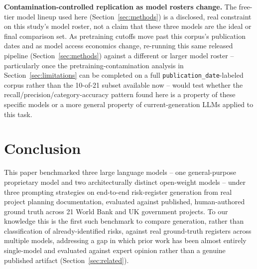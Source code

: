 \documentclass[conference]{IEEEtran}
\begin{document}
\textbf{Contamination-controlled replication as model rosters change.} The
free-tier model lineup used here (Section~\ref{sec:methods}) is a
disclosed, real constraint on this study's model roster, not a claim that
these three models are the ideal or final comparison set. As pretraining
cutoffs move past this corpus's publication dates and as model access
economics change, re-running this same released pipeline
(Section~\ref{sec:methods}) against a different or larger model roster --
particularly once the pretraining-contamination analysis in
Section~\ref{sec:limitations} can be completed on a full
\texttt{publication\_date}-labeled corpus rather than the 10-of-21 subset
available now -- would test whether the recall/precision/category-accuracy
pattern found here is a property of these specific models or a more general
property of current-generation LLMs applied to this task.

\section{Conclusion}

This paper benchmarked three large language models -- one general-purpose
proprietary model and two architecturally distinct open-weight models --
under three prompting strategies on end-to-end risk-register generation
from real project planning documentation, evaluated against published,
human-authored ground truth across 21 World Bank and UK government
projects. To our knowledge this is the first such benchmark to compare
generation, rather than classification of already-identified risks, against
real ground-truth registers across multiple models, addressing a gap in
which prior work has been almost entirely single-model and evaluated
against expert opinion rather than a genuine published artifact
(Section~\ref{sec:related}).
\end{document}
